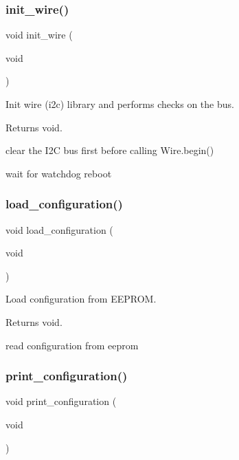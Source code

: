 \subsubsection{\texorpdfstring{init\+\_\+wire()}{init\_wire()}}
{\footnotesize\ttfamily void init\+\_\+wire (\begin{DoxyParamCaption}\item[{void}]{ }\end{DoxyParamCaption})}



Init wire (i2c) library and performs checks on the bus. 

\begin{DoxyReturn}{Returns}
void. 
\end{DoxyReturn}
clear the I2C bus first before calling Wire.\+begin()

wait for watchdog reboot \mbox{\label{i2c-rain_8h_a1be652e7d942160a14a560e0be837358}} 
\subsubsection{\texorpdfstring{load\+\_\+configuration()}{load\_configuration()}}
{\footnotesize\ttfamily void load\+\_\+configuration (\begin{DoxyParamCaption}\item[{void}]{ }\end{DoxyParamCaption})}



Load configuration from E\+E\+P\+R\+OM. 

\begin{DoxyReturn}{Returns}
void. 
\end{DoxyReturn}
read configuration from eeprom \mbox{\label{i2c-rain_8h_ab08b9047f47849f399950705e769be2e}} 
\subsubsection{\texorpdfstring{print\+\_\+configuration()}{print\_configuration()}}
{\footnotesize\ttfamily void print\+\_\+configuration (\begin{DoxyParamCaption}\item[{void}]{ }\end{DoxyParamCaption})}



